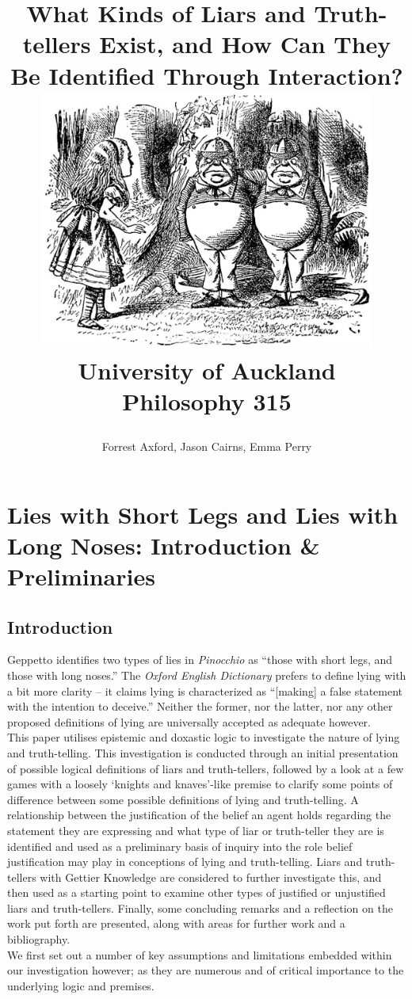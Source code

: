 \documentclass[12pt, titlepage, twoside, a4paper]{report}
\title{
{What Kinds of Liars and Truth-tellers Exist, and How Can They Be Identified Through Interaction?} \newline \newline
{\includegraphics[width=11cm]{alice.eps}}\\
{\large University of Auckland}\\
{\large Philosophy 315}\\
\author{Forrest Axford, Jason Cairns, Emma Perry}}
\begin{document}
\maketitle
\tableofcontents

\chapter{Lies with Short Legs and Lies with Long Noses: Introduction \& Preliminaries}

\section{Introduction}
Geppetto identifies two types of lies in \textit{Pinocchio} as ``those with short legs, and those with long noses.'' The \textit{Oxford English Dictionary} prefers to define lying with a bit more clarity – it claims lying is characterized as ``[making] a false statement with the intention to deceive.'' \autocite{WeinerE.S.C.1989TOEd} Neither the former, nor the latter, nor any other proposed definitions of lying are universally accepted as adequate however.\autocite{sep-lying-definition}\\
This paper utilises epistemic and doxastic logic to investigate the nature of lying and truth-telling. This investigation is conducted through an initial presentation of possible logical definitions of liars and truth-tellers, followed by a look at a few games with a loosely `knights and knaves’-like premise to clarify some points of difference between some possible definitions of lying and truth-telling. A relationship between the justification of the belief an agent holds regarding the statement they are expressing and what type of liar or truth-teller they are is identified and used as a preliminary basis of inquiry into the role belief justification may play in conceptions of lying and truth-telling. Liars and truth-tellers with Gettier Knowledge are considered to further investigate this, and then used as a starting point to examine other types of justified or unjustified liars and truth-tellers. Finally, some concluding remarks and a reflection on the work put forth are presented, along with areas for further work and a bibliography.\\
We first set out a number of key assumptions and limitations embedded within our investigation however; as they are numerous and of critical importance to the underlying logic and premises.
\end{document}
